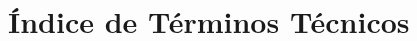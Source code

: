 \documentclass[12pt,a4paper]{article}
\begin{document}
\newpage
\section*{Índice de Términos Técnicos}
\begin{multicols}{2}
\printindex
\end{multicols}
\end{document}
